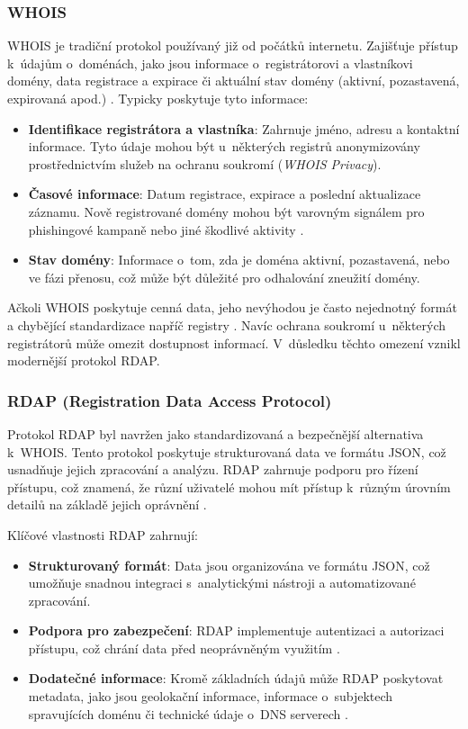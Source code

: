 \subsubsection*{WHOIS}
WHOIS je tradiční protokol používaný již od počátků internetu. Zajišťuje přístup k~údajům o~doménách, jako jsou informace o~registrátorovi a vlastníkovi domény, data registrace a expirace či aktuální stav domény (aktivní, pozastavená, expirovaná apod.) \cite{mockdomain}. Typicky poskytuje tyto informace:
\begin{itemize}
    \item \textbf{Identifikace registrátora a vlastníka}: Zahrnuje jméno, adresu a kontaktní informace. Tyto údaje mohou být u~některých registrů anonymizovány prostřednictvím služeb na ochranu soukromí (\emph{WHOIS Privacy}).
    \item \textbf{Časové informace}: Datum registrace, expirace a poslední aktualizace záznamu. Nově registrované domény mohou být varovným signálem pro phishingové kampaně nebo jiné škodlivé aktivity \cite{ma2009beyondblacklists}.
    \item \textbf{Stav domény}: Informace o~tom, zda je doména aktivní, pozastavená, nebo ve fázi přenosu, což může být důležité pro odhalování zneužití domény.
\end{itemize}

Ačkoli WHOIS poskytuje cenná data, jeho nevýhodou je často nejednotný formát a chybějící standardizace napříč registry \cite{campos2019rdap}. Navíc ochrana soukromí u~některých registrátorů může omezit dostupnost informací. V~důsledku těchto omezení vznikl modernější protokol RDAP.

\subsubsection*{RDAP (Registration Data Access Protocol)}
Protokol RDAP byl navržen jako standardizovaná a bezpečnější alternativa k~WHOIS. Tento protokol poskytuje strukturovaná data ve formátu JSON, což usnadňuje jejich zpracování a analýzu. RDAP zahrnuje podporu pro řízení přístupu, což znamená, že různí uživatelé mohou mít přístup k~různým úrovním detailů na základě jejich oprávnění \cite{shah2021rdap}.

\noindent Klíčové vlastnosti RDAP zahrnují:
\begin{itemize}
    \item \textbf{Strukturovaný formát}: Data jsou organizována ve formátu JSON, což umožňuje snadnou integraci s~analytickými nástroji a automatizované zpracování.
    \item \textbf{Podpora pro zabezpečení}: RDAP implementuje autentizaci a autorizaci přístupu, což chrání data před neoprávněným využitím \cite{ma2009beyondblacklists}.
    \item \textbf{Dodatečné informace}: Kromě základních údajů může RDAP poskytovat metadata, jako jsou geolokační informace, informace o~subjektech spravujících doménu či technické údaje o~DNS serverech \cite{campos2019rdap}.
\end{itemize}

